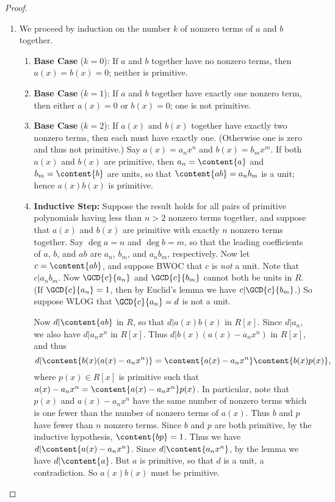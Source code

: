 \documentclass{article}
\begin{document}
\begin{proof} \mbox{}
\begin{enumerate}
\item We proceed by induction on the number $k$ of nonzero terms of $a$ and $b$ together.
\begin{enumerate}
\item \textbf{Base Case} ($k = 0$): If $a$ and $b$ together have no nonzero terms, then $a(x) = b(x) = 0$; neither is primitive.
\item \textbf{Base Case} ($k = 1$): If $a$ and $b$ together have exactly one nonzero term, then either $a(x) = 0$ or $b(x) = 0$; one is not primitive.
\item \textbf{Base Case} ($k = 2$): If $a(x)$ and $b(x)$ together have exactly two nonzero terms, then each must have exactly one. (Otherwise one is zero and thus not primitive.) Say $a(x) = a_n x^n$ and $b(x) = b_m x^m$. If both $a(x)$ and $b(x)$ are primitive, then $a_n = \content{a}$ and $b_m = \content{b}$ are units, so that $\content{ab} = a_nb_m$ is a unit; hence $a(x)b(x)$ is primitive.
\item \textbf{Inductive Step:} Suppose the result holds for all pairs of primitive polynomials having less than $n > 2$ nonzero terms together, and suppose that $a(x)$ and $b(x)$ are primitive with exactly $n$ nonzero terms together. Say $\deg{a} = n$ and $\deg{b} = m$, so that the leading coefficients of $a$, $b$, and $ab$ are $a_n$, $b_m$, and $a_nb_m$, respectively. Now let $c = \content{ab}$, and suppose BWOC that $c$ is \emph{not} a unit. Note that $c|a_nb_m$. Now $\GCD{c}{a_n}$ and $\GCD{c}{b_m}$ cannot both be units in $R$. (If $\GCD{c}{a_n} = 1$, then by Euclid's lemma we have $c | \GCD{c}{b_m}$.) So suppose WLOG that $\GCD{c}{a_n} = d$ is not a unit.

Now $d|\content{ab}$ in $R$, so that $d|a(x)b(x)$ in $R[x]$. Since $d|a_n$, we also have $d|a_nx^n$ in $R[x]$. Thus $d|b(x)(a(x) - a_nx^n)$ in $R[x]$, and thus \[ d | \content{b(x)(a(x) - a_nx^n)} = \content{a(x) - a_nx^n}\content{b(x)p(x)}, \] where $p(x) \in R[x]$ is primitive such that $a(x) - a_nx^n = \content{a(x) - a_nx^n}p(x)$. In particular, note that $p(x)$ and $a(x) - a_nx^n$ have the same number of nonzero terms which is one fewer than the number of nonzero terms of $a(x)$. Thus $b$ and $p$ have fewer than $n$ nonzero terms. Since $b$ and $p$ are both primitive, by the inductive hypothesis, $\content{bp} = 1$. Thus we have $d|\content{a(x) - a_nx^n}$. Since $d|\content{a_nx^n}$, by the lemma we have $d|\content{a}$. But $a$ is primitive, so that $d$ is a unit, a contradiction. So $a(x)b(x)$ must be primitive.
\end{enumerate}


\end{enumerate}
\end{proof}
\end{document}
